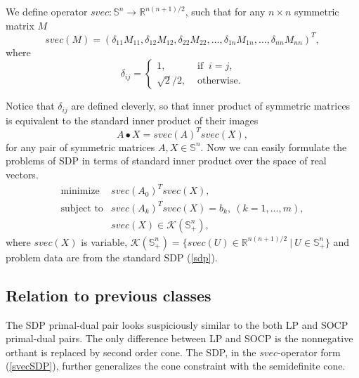 \documentclass[12pt]{book}
\theoremstyle{definition}
\begin{document}
 \label{svec}
We define operator $svec: \mathbb{S}^n \rightarrow \mathbb{R}^{n(n+1)/2}$, such that for any $n\times n$ symmetric matrix $M$
\begin{equation}
	svec(M) = ( \delta_{11}M_{11},\delta_{12}M_{12},\delta_{22}M_{22},\dots ,\delta_{1n}M_{1n},\dots ,\delta_{nn}M_{nn})^T,
\end{equation}
where
\begin{equation}
	\delta_{ij}= \left\lbrace 
	\begin{array}{ll} 
		1, &\mbox{ if }\ i=j, \\ 
		\sqrt{2}/2, &\mbox{ otherwise.} 
	\end{array} \right.
\end{equation}

Notice that $\delta_{ij}$ are defined cleverly, so that inner product of symmetric matrices is equivalent to the standard inner product of their images
\begin{equation}
A\bullet X= svec(A)^Tsvec(X), 
\end{equation}
for any pair of symmetric matrices $A,X\in \mathbb{S}^n.$  Now we can easily formulate the problems of SDP in terms of standard inner product over the space of real vectors. 
\begin{equation}
\label{svecSDP}
\begin{array}{ll}
\mbox{minimize} & svec(A_0)^T svec(X),\\
\mbox{subject to}& svec(A_k)^T svec(X)  = b_k, \ (k = 1,\dots ,m), \\
& svec(X) \in \mathcal{K}(\mathbb{S}^n_+),
\end{array}
\end{equation}
where $svec(X)$ is variable,  $\mathcal{K}(\mathbb{S}^n_+) = \{svec(U)\in \mathbb{R}^{n(n+1)/2}\ |\ U\in \mathbb{S}^n_+\}$ 
and problem data are from the standard SDP (\ref{sdp}).


\subsection{Relation to previous classes}
The  SDP primal-dual pair looks suspiciously similar to the both LP and SOCP primal-dual pairs. 
The only difference between LP and SOCP is the nonnegative orthant is replaced by second order cone. 
The SDP, in the $svec$-operator form (\ref{svecSDP}), further generalizes the cone constraint with the semidefinite cone.
\end{document}
